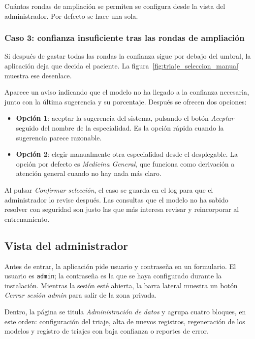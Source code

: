 Cuántas rondas de ampliación se permiten se configura desde la vista del administrador. Por defecto se hace una sola.

\subsubsection*{Caso 3: confianza insuficiente tras las rondas de ampliación}

Si después de gastar todas las rondas la confianza sigue por debajo del umbral, la aplicación deja que decida el paciente. La figura~\ref{fig:triaje_seleccion_manual} muestra ese desenlace.


Aparece un aviso indicando que el modelo no ha llegado a la confianza necesaria, junto con la última sugerencia y su porcentaje. Después se ofrecen dos opciones:

\begin{itemize}
	\item \textbf{Opción 1}: aceptar la sugerencia del sistema, pulsando el botón \textit{Aceptar} seguido del nombre de la especialidad. Es la opción rápida cuando la sugerencia parece razonable.
	\item \textbf{Opción 2}: elegir manualmente otra especialidad desde el desplegable. La opción por defecto es \textit{Medicina General}, que funciona como derivación a atención general cuando no hay nada más claro.
\end{itemize}

Al pulsar \textit{Confirmar selección}, el caso se guarda en el log para que el administrador lo revise después. Las consultas que el modelo no ha sabido resolver con seguridad son justo las que más interesa revisar y reincorporar al entrenamiento.

\subsection{Vista del administrador}

Antes de entrar, la aplicación pide usuario y contraseña en un formulario. El usuario es \texttt{admin}; la contraseña es la que se haya configurado durante la instalación. Mientras la sesión esté abierta, la barra lateral muestra un botón \textit{Cerrar sesión admin} para salir de la zona privada.

Dentro, la página se titula \textit{Administración de datos} y agrupa cuatro bloques, en este orden: configuración del triaje, alta de nuevos registros, regeneración de los modelos y registro de triajes con baja confianza o reportes de error.

